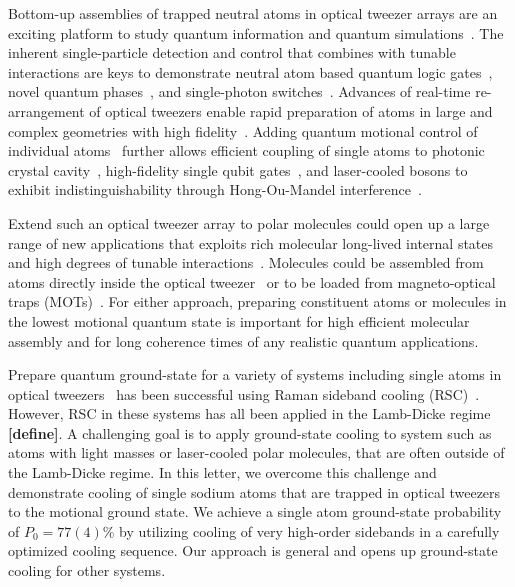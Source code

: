\documentclass[aps,prl,twocolumn,groupedaddress]{revtex4-1}
\renewcommand{\fxnote}[1]{{\textbf{[#1]}}}
\begin{document}
Bottom-up assemblies of trapped neutral atoms in optical tweezer arrays
are an exciting platform to study quantum information and quantum simulations~\cite{Schlosser2001,Weiss2004,Isenhower2010,Wilk2010,Kaufman2015,Labuhn2016,Murmann2015}.
The inherent single-particle detection and control that combines with tunable interactions
are keys to demonstrate neutral atom based quantum logic gates~\cite{Isenhower2010,Wilk2010},
novel quantum phases~\cite{Labuhn2016}, and single-photon switches~\cite{Dayan2008,Tiecke2014}.
Advances of real-time re-arrangement of optical tweezers enable rapid preparation of atoms
in large and complex geometries with high fidelity~\cite{Barredo2016,Endres2016}.
Adding quantum motional control of individual
atoms~\cite{Li2012,Kaufman2012,Thompson2013,qfLiu2017,Robens2017} further allows
efficient coupling of single atoms to photonic crystal cavity~\cite{Thompson2013a},
high-fidelity single qubit gates~\cite{Wang2016},
and laser-cooled bosons to exhibit indistinguishability
through Hong-Ou-Mandel interference~\cite{Kaufman2014}.

Extend such an optical tweezer array to polar molecules could open up a large range of
new applications that exploits rich molecular long-lived internal states
and high degrees of tunable interactions~\cite{DeMille2002,Ni2008,Gorshkov2011,Yan2013}.
Molecules could be assembled from atoms directly inside the optical tweezer~\cite{Liu2017}
or to be loaded from magneto-optical traps
(MOTs)~\cite{Barry2014,Truppe2017SubDoppler,Anderegg2017}.
For either approach, preparing constituent atoms or molecules in the lowest motional
quantum state is important for high efficient molecular assembly
and for long coherence times of any realistic quantum applications.

Prepare quantum ground-state for a variety of systems including
single atoms in optical tweezers~\cite{Kaufman2012,Thompson2013,Liu2017,Robens2017}
has been successful using Raman sideband cooling (RSC)~\cite{Monroe1995,Kerman2000,Han2000}.
However, RSC in these systems has all been applied in the Lamb-Dicke regime \fxnote{define}.
A challenging goal is to apply ground-state cooling to system such as atoms with light masses
or laser-cooled polar molecules, that are often outside of the Lamb-Dicke regime.
In this letter, we overcome this challenge and demonstrate cooling of single sodium atoms
that are trapped in optical tweezers to the motional ground state.
We achieve a single atom ground-state probability of $P_0=77(4)\%$ by utilizing cooling of
very high-order sidebands in a carefully optimized cooling sequence.
Our approach is  general and opens up ground-state cooling for other systems.
\end{document}
